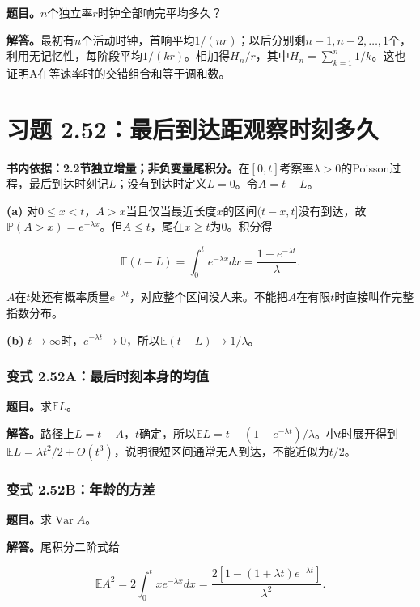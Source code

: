 \documentclass[12pt,a4paper,UTF8,fontset=fandol]{ctexart}
\begin{document}
\textbf{题目。}\(n\)个独立率\(r\)时钟全部响完平均多久？

\textbf{解答。}最初有\(n\)个活动时钟，首响平均\(1/(nr)\)；以后分别剩\(n-1,n-2,\ldots,1\)个，利用无记忆性，每阶段平均\(1/(kr)\)。相加得\(H_n/r\)，其中\(H_n=\sum_{k=1}^n1/k\)。这也证明A在等速率时的交错组合和等于调和数。

\section{习题
2.52：最后到达距观察时刻多久}\label{ux4e60ux9898-2.52ux6700ux540eux5230ux8fbeux8dddux89c2ux5bdfux65f6ux523bux591aux4e45}

\textbf{书内依据：2.2节独立增量；非负变量尾积分。}在\([0,t]\)考察率\(\lambda>0\)的Poisson过程，最后到达时刻记\(L\)；没有到达时定义\(L=0\)。令\(A=t-L\)。

\textbf{(a)}
对\(0\le x<t\)，\(A>x\)当且仅当最近长度\(x\)的区间\((t-x,t]\)没有到达，故\(\mathbb P(A>x)=e^{-\lambda x}\)。但\(A\le t\)，尾在\(x\ge t\)为0。积分得

\[\boxed{\mathbb E(t-L)=\int_0^t e^{-\lambda x}dx=\frac{1-e^{-\lambda t}}\lambda.}\]

\(A\)在\(t\)处还有概率质量\(e^{-\lambda t}\)，对应整个区间没人来。不能把\(A\)在有限\(t\)时直接叫作完整指数分布。

\textbf{(b)}
\(t\to\infty\)时，\(e^{-\lambda t}\to0\)，所以\(\boxed{\mathbb E(t-L)\to1/\lambda}\)。

\subsubsection{变式
2.52A：最后时刻本身的均值}\label{ux53d8ux5f0f-2.52aux6700ux540eux65f6ux523bux672cux8eabux7684ux5747ux503c}

\textbf{题目。}求\(\mathbb EL\)。

\textbf{解答。}路径上\(L=t-A\)，\(t\)确定，所以\(\mathbb EL=t-(1-e^{-\lambda t})/\lambda\)。小\(t\)时展开得到\(\mathbb EL=\lambda t^2/2+O(t^3)\)，说明很短区间通常无人到达，不能近似为\(t/2\)。

\subsubsection{变式
2.52B：年龄的方差}\label{ux53d8ux5f0f-2.52bux5e74ux9f84ux7684ux65b9ux5dee}

\textbf{题目。}求\(\operatorname{Var}A\)。

\textbf{解答。}尾积分二阶式给

\[\mathbb EA^2=2\int_0^t xe^{-\lambda x}dx
=\frac{2[1-(1+\lambda t)e^{-\lambda t}]}{\lambda^2}.\]
\end{document}
